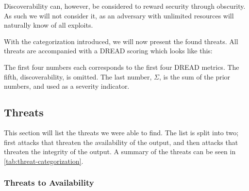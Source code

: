 Discoverability can, however, be considered to reward security through obscurity. As such we will not consider it, as an adversary with unlimited resources will naturally know of all exploits.

With the categorization introduced, we will now present the found threats.
All threats are accompanied with a DREAD scoring which looks like this:

\begin{center}
\end{center}

The first four numbers each corresponds to the first four DREAD metrics. The fifth, discoverability, is omitted. The last number, $\Sigma$, is the sum of the prior numbers, and used as a severity indicator.

\subsection{Threats}
This section will list the threats we were able to find. The list is split into two; first attacks that threaten the availability of the output, and then attacks that threaten the integrity of the output. A summary of the threats can be seen in \vref{tab:threat-categorization}.

\subsubsection{Threats to Availability}

\newcommand{\parathreat}[1]{\paragraph{#1}\hspace{-1ex}}

